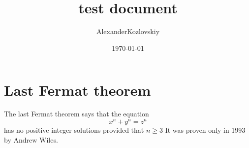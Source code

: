 \documentclass{article}
\title{test document}
\author{AlexanderKozlovskiy}
\date{\today}
\begin{document}
\section{Last Fermat theorem}

The last Fermat theorem says that the equation 
\[ 
x^n+y^n=z^n 
\] has no positive integer solutions provided that \( n\ge 3 \) It was proven only in 1993 by Andrew Wiles.
\end{document}
